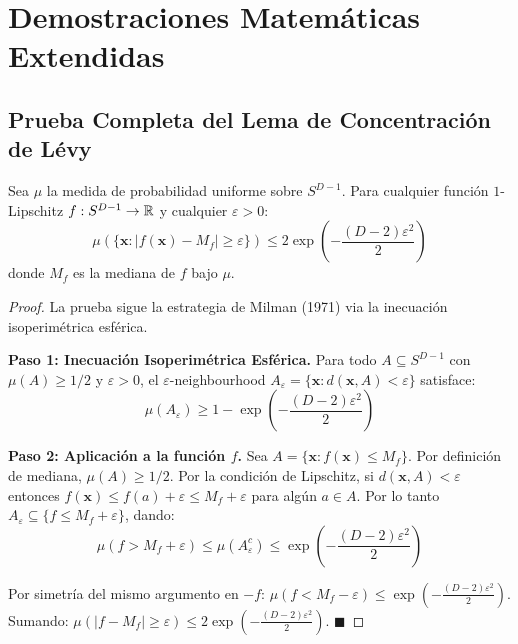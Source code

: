 \chapter{Demostraciones Matemáticas Extendidas}
\label{ap:demostraciones}

\section{Prueba Completa del Lema de Concentración de Lévy}

\begin{lemma}
Sea $\mu$ la medida de probabilidad uniforme sobre $S^{D-1}$. Para cualquier función
$1$-Lipschitz $f: S^{D-1} \to \mathbb{R}$ y cualquier $\varepsilon > 0$:
\begin{equation}
\mu\left(\{ \mathbf{x} : |f(\mathbf{x}) - M_f| \ge \varepsilon \}\right) \le 2 \exp\!\left(-\frac{(D-2)\varepsilon^2}{2}\right)
\end{equation}
donde $M_f$ es la mediana de $f$ bajo $\mu$.
\end{lemma}

\begin{proof}
La prueba sigue la estrategia de Milman (1971) via la inecuación isoperimétrica esférica.

\textbf{Paso 1: Inecuación Isoperimétrica Esférica.}
Para todo $A \subseteq S^{D-1}$ con $\mu(A) \ge 1/2$ y $\varepsilon > 0$,
el $\varepsilon$-neighbourhood $A_\varepsilon = \{\mathbf{x} : d(\mathbf{x}, A) < \varepsilon\}$ satisface:
\begin{equation}
\mu(A_\varepsilon) \ge 1 - \exp\!\left(-\frac{(D-2)\varepsilon^2}{2}\right)
\end{equation}

\textbf{Paso 2: Aplicación a la función $f$.}
Sea $A = \{\mathbf{x} : f(\mathbf{x}) \le M_f\}$. Por definición de mediana, $\mu(A) \ge 1/2$.
Por la condición de Lipschitz, si $d(\mathbf{x}, A) < \varepsilon$ entonces
$f(\mathbf{x}) \le f(a) + \varepsilon \le M_f + \varepsilon$ para algún $a \in A$.
Por lo tanto $A_\varepsilon \subseteq \{f \le M_f + \varepsilon\}$, dando:
\begin{equation}
\mu(f > M_f + \varepsilon) \le \mu(A_\varepsilon^c) \le \exp\!\left(-\frac{(D-2)\varepsilon^2}{2}\right)
\end{equation}

Por simetría del mismo argumento en $-f$: $\mu(f < M_f - \varepsilon) \le \exp(-\frac{(D-2)\varepsilon^2}{2})$.
Sumando: $\mu(|f - M_f| \ge \varepsilon) \le 2\exp(-\frac{(D-2)\varepsilon^2}{2})$. $\blacksquare$
\end{proof}

